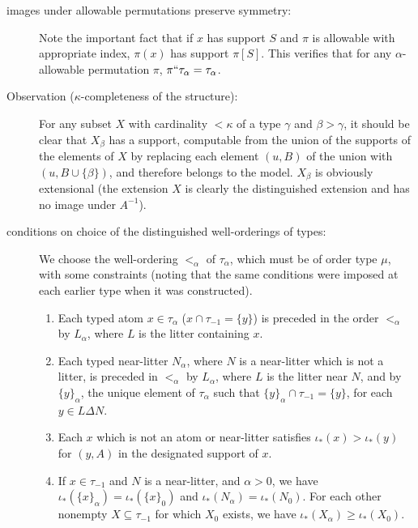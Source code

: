 \documentclass[112pt]{article}
\begin{document}
\begin{description}
\item[images under allowable permutations preserve symmetry:]  Note the important fact that if $x$ has support $S$ and $\pi$ is allowable with appropriate index, $\pi(x)$ has support $\pi[S]$.  This verifies that for any $\alpha$-allowable permutation $\pi$, $\pi``\tau_\alpha = \tau_\alpha$.

\item[Observation ($\kappa$-completeness of the structure):]  For any subset $X$ with cardinality $<\kappa$ of a type $\gamma$ and $\beta>\gamma$, it should be clear that $X_\beta$ has a support, computable from the union of the supports of the elements of $X$  by replacing each element $(u,B)$ of the union with $(u,B \cup \{\beta\})$, and therefore belongs to the model.  $X_\beta$ is obviously extensional (the extension $X$ is clearly the distinguished extension and has no image under $A^{-1}$).

\item[conditions on choice of the distinguished well-orderings of types:]  We choose the well-ordering $<_\alpha$ of $\tau_\alpha$, which must be of order type $\mu$, with some constraints (noting that the same conditions were imposed at each earlier type when it was constructed).

\begin{enumerate}

\item Each typed atom $x \in \tau_\alpha$ ($x \cap \tau_{-1} = \{y\}$) is preceded in the order $<_\alpha$ by $L_\alpha$, where $L$ is the litter containing $x$.

\item Each typed near-litter $N_\alpha$, where $N$ is a near-litter which is not a litter, is preceded in $<_\alpha$ by $L_\alpha$, where $L$ is the litter near $N$,
and by $\{y\}_\alpha$, the unique element of $\tau_\alpha$ such that $\{y\}_\alpha \cap \tau_{-1} = \{y\}$, for each $y \in L \Delta N$.

\item Each $x$ which is not an atom or near-litter satisfies $\iota_*(x) > \iota_*(y)$ for $(y,A)$ in the designated support of $x$.

\item  If $x \in \tau_{-1}$ and $N$ is a near-litter, and $\alpha>0$, we have $\iota_*(\{x\}_\alpha) = \iota_*(\{x\}_0)$
and $\iota_*(N_\alpha) = \iota_*(N_0)$.  For each other nonempty $X \subseteq \tau_{-1}$ for which $X_0$ exists,
we have $\iota_*(X_\alpha) \geq \iota_*(X_0)$.


\end{enumerate}
\end{description}
\end{document}
